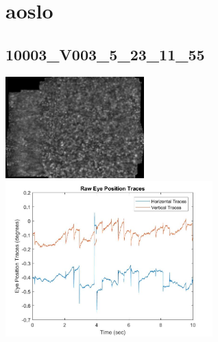 \documentclass[11pt]{article}
\begin{document}
\section{aoslo}

\subsection{10003\_V003\_5\_23\_11\_55}
\includegraphics[width=0.40\textwidth, valign=m]{referenceframes/aoslo/10003_V003_5_23_11_55_dwt_nostim_gamscaled_bandfilt_refframe.jpg}
\includegraphics[width=0.60\textwidth, valign=m]{eyepositiontraces/aoslo/10003_V003_5_23_11_55.jpg}\\
\end{document}
